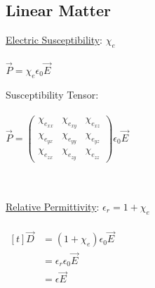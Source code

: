 \documentclass[12pt]{article}
\begin{document}
\newpage
\subsection{Linear Matter}
\hfill \break
\begin{minipage}[t]{0.48\textwidth}
	\setlength{\parindent}{.5cm}
	
	\noindent \underline{Electric Susceptibility}: \( \chi_e \) \\ \\
	\indent \indent \( \vec{ P } = \chi_e \epsilon_0 \vec{E} \)

	\hfill \break
	Susceptibility Tensor: \\ \\
	\indent \indent \( \vec{ P } = 
		\begin{pmatrix}
			\chi_{e_{xx}} & \chi_{e_{xy}} & \chi_{e_{xz}} \\
			\chi_{e_{yx}} & \chi_{e_{yy}} & \chi_{e_{yz}} \\
			\chi_{e_{zx}} & \chi_{e_{zy}} & \chi_{e_{zz}}
		\end{pmatrix}
		\epsilon_0 \vec{E} \)

	\hfill \break \\ \\
	\underline{Relative Permittivity}: \( \epsilon_r = 1 + \chi_e \)\\ \\
	\indent \indent \( \begin{aligned}[t]
			\vec{D} &= ( 1 + \chi_e ) \epsilon_0 \vec{E} \\ 
			&= \epsilon_r \epsilon_0 \vec{E}\\
			&= \epsilon \vec{E}
	\end{aligned} \)

\end{minipage}
\hfill\vline\hfill
\end{document}
